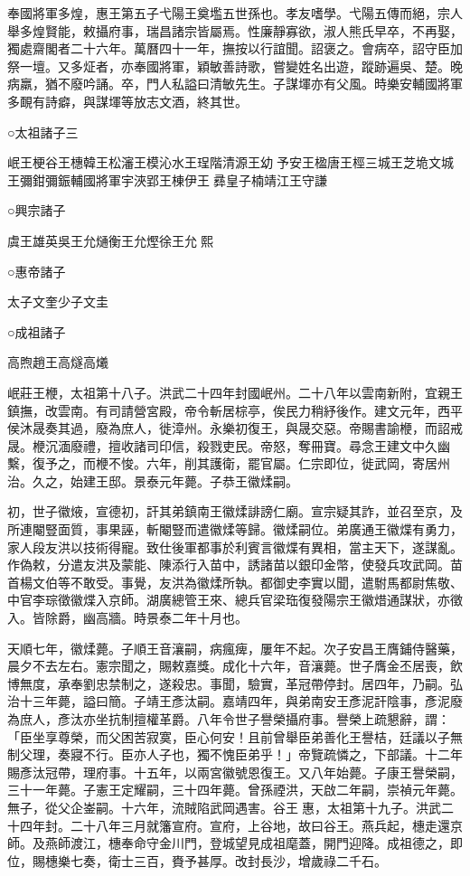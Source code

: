 奉國將軍多煌，惠王第五子弋陽王奠壏五世孫也。孝友嗜學。弋陽五傳而絕，宗人舉多煌賢能，敕攝府事，瑞昌諸宗皆屬焉。性廉靜寡欲，淑人熊氏早卒，不再娶，獨處齋閣者二十六年。萬曆四十一年，撫按以行誼聞。詔褒之。會病卒，詔守臣加祭一壇。又多炡者，亦奉國將軍，穎敏善詩歌，嘗變姓名出遊，蹤跡遍吳、楚。晚病羸，猶不廢吟誦。卒，門人私謚曰清敏先生。子謀堚亦有父風。時樂安輔國將軍多靦有詩癖，與謀堚等放志文酒，終其世。

○太祖諸子三

岷王梗谷王橞韓王松瀋王模沁水王珵階清源王幼予安王楹唐王桱三城王芝垝文城王彌鉗彌鋠輔國將軍宇浹郢王棟伊王彞皇子楠靖江王守謙

○興宗諸子

虞王雄英吳王允熥衡王允熞徐王允熙

○惠帝諸子

太子文奎少子文圭

○成祖諸子

高煦趙王高燧高爔

岷莊王楩，太祖第十八子。洪武二十四年封國岷州。二十八年以雲南新附，宜親王鎮撫，改雲南。有司請營宮殿，帝令斬居棕亭，俟民力稍紓後作。建文元年，西平侯沐晟奏其過，廢為庶人，徙漳州。永樂初復王，與晟交惡。帝賜書諭楩，而詔戒晟。楩沉湎廢禮，擅收諸司印信，殺戮吏民。帝怒，奪冊寶。尋念王建文中久幽繫，復予之，而楩不悛。六年，削其護衛，罷官屬。仁宗即位，徙武岡，寄居州治。久之，始建王邸。景泰元年薨。子恭王徽煣嗣。

初，世子徽焲，宣德初，訐其弟鎮南王徽煣誹謗仁廟。宣宗疑其詐，並召至京，及所連閹豎面質，事果誣，斬閹豎而遣徽煣等歸。徽煣嗣位。弟廣通王徽煠有勇力，家人段友洪以技術得寵。致仕後軍都事於利賓言徽煠有異相，當主天下，遂謀亂。作偽敕，分遣友洪及蒙能、陳添行入苗中，誘諸苗以銀印金幣，使發兵攻武岡。苗首楊文伯等不敢受。事覺，友洪為徽煣所執。都御史李實以聞，遣駙馬都尉焦敬、中官李琮徵徽煠入京師。湖廣總管王來、總兵官梁珤復發陽宗王徽焟通謀狀，亦徵入。皆除爵，幽高牆。時景泰二年十月也。

天順七年，徽煣薨。子順王音瀼嗣，病瘋痺，屢年不起。次子安昌王膺鋪侍醫藥，晨夕不去左右。憲宗聞之，賜敕嘉獎。成化十六年，音瀼薨。世子膺金丕居喪，飲博無度，承奉劉忠禁制之，遂殺忠。事聞，驗實，革冠帶停封。居四年，乃嗣。弘治十三年薨，謚曰簡。子靖王彥汰嗣。嘉靖四年，與弟南安王彥泥訐陰事，彥泥廢為庶人，彥汰亦坐抗制擅權革爵。八年令世子譽榮攝府事。譽榮上疏懇辭，謂：「臣坐享尊榮，而父困苦寂寞，臣心何安！且前曾舉臣弟善化王譽桔，廷議以子無制父理，奏寢不行。臣亦人子也，獨不愧臣弟乎！」帝覽疏憐之，下部議。十二年賜彥汰冠帶，理府事。十五年，以兩宮徽號恩復王。又八年始薨。子康王譽榮嗣，三十一年薨。子憲王定耀嗣，三十四年薨。曾孫禋洪，天啟二年嗣，崇禎元年薨。無子，從父企崟嗣。十六年，流賊陷武岡遇害。谷王惠，太祖第十九子。洪武二十四年封。二十八年三月就籓宣府。宣府，上谷地，故曰谷王。燕兵起，橞走還京師。及燕師渡江，橞奉命守金川門，登城望見成祖麾蓋，開門迎降。成祖德之，即位，賜橞樂七奏，衛士三百，賚予甚厚。改封長沙，增歲祿二千石。


